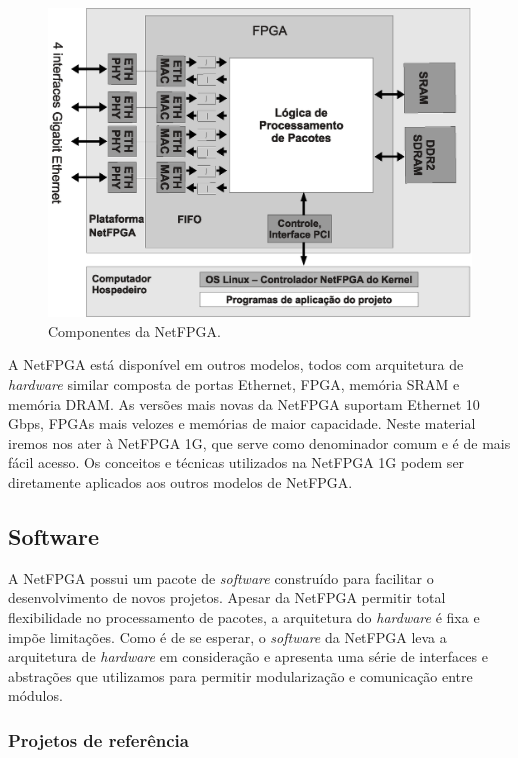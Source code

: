\begin{figure}
\centering
\includegraphics[scale=0.6,angle=0]{figures/placa/infraplaca.eps}
\caption{Componentes da NetFPGA.}
\label{fig:arch.hardware}
\end{figure}

A NetFPGA está disponível em outros modelos, todos com arquitetura
de \emph{hardware} similar composta de portas Ethernet, FPGA,
memória SRAM e memória DRAM.  As versões mais novas da NetFPGA
suportam Ethernet 10\,Gbps, FPGAs mais velozes e memórias de maior
capacidade.  Neste material iremos nos ater à NetFPGA 1G, que serve
como denominador comum e é de mais fácil acesso.  Os conceitos e
técnicas utilizados na NetFPGA 1G podem ser diretamente aplicados
aos outros modelos de NetFPGA.

\subsection{Software}
\label{sec:arch.soft}

A NetFPGA possui um pacote de \emph{software} construído para
facilitar o desenvolvimento de novos projetos.  Apesar da NetFPGA
permitir total flexibilidade no processamento de pacotes, a
arquitetura do \emph{hardware} é fixa e impõe limitações.  Como é de
se esperar, o \emph{software} da NetFPGA leva a arquitetura de
\emph{hardware} em consideração e apresenta uma série de interfaces
e abstrações que utilizamos para permitir modularização e
comunicação entre módulos.

\subsubsection{Projetos de referência}

